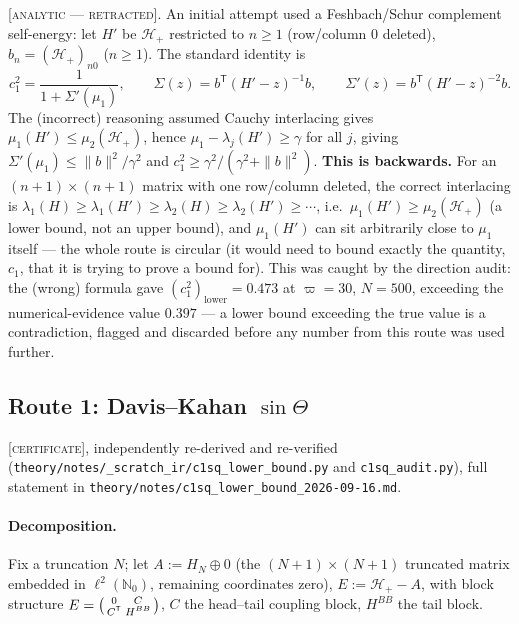 \documentclass[11pt]{article}
\newcommand{\HH}{\mathcal{H}}
\begin{document}
\textsc{[analytic --- retracted]}. An initial attempt used a Feshbach/Schur
complement self-energy: let $H'$ be $\HH_+$ restricted to $n\ge1$ (row/column
0 deleted), $b_n=(\HH_+)_{n0}$ ($n\ge1$). The standard identity is
\[
 c_1^2=\frac1{1+\Sigma'(\mu_1)},\qquad \Sigma(z)=b^{\mathsf T}(H'-z)^{-1}b,\qquad
 \Sigma'(z)=b^{\mathsf T}(H'-z)^{-2}b.
\]
The (incorrect) reasoning assumed Cauchy interlacing gives
$\mu_1(H')\le\mu_2(\HH_+)$, hence $\mu_1-\lambda_j(H')\ge\gamma$ for all $j$,
giving $\Sigma'(\mu_1)\le\|b\|^2/\gamma^2$ and
$c_1^2\ge\gamma^2/(\gamma^2+\|b\|^2)$. \textbf{This is backwards.} For an
$(n+1)\times(n+1)$ matrix with one row/column deleted, the correct interlacing
is $\lambda_1(H)\ge\lambda_1(H')\ge\lambda_2(H)\ge\lambda_2(H')\ge\cdots$,
i.e.\ $\mu_1(H')\ge\mu_2(\HH_+)$ (a lower bound, not an upper bound), and
$\mu_1(H')$ can sit arbitrarily close to $\mu_1$ itself --- the whole route
is circular (it would need to bound exactly the quantity, $c_1$, that it is
trying to prove a bound for). This was caught by the direction audit: the
(wrong) formula gave $(c_1^2)_{\text{lower}}=0.473$ at $\varpi=30$, $N=500$,
exceeding the numerical-evidence value $0.397$ --- a lower bound exceeding
the true value is a contradiction, flagged and discarded before any number
from this route was used further.

\subsection{Route 1: Davis--Kahan $\sin\Theta$}\label{sec:dk}

\textsc{[certificate]}, independently re-derived and re-verified
(\texttt{theory/notes/\_scratch\_ir/c1sq\_lower\_bound.py} and
\texttt{c1sq\_audit.py}), full statement in
\texttt{theory/notes/c1sq\_lower\_bound\_2026-09-16.md}.

\paragraph{Decomposition.} Fix a truncation $N$; let $A:=H_N\oplus0$ (the
$(N{+}1)\times(N{+}1)$ truncated matrix embedded in $\ell^2(\mathbb N_0)$,
remaining coordinates zero), $E:=\HH_+-A$, with block structure
$E=\begin{psmallmatrix}0&C\\ C^{\mathsf T}&H^{BB}\end{psmallmatrix}$, $C$ the
head--tail coupling block, $H^{BB}$ the tail block.
\end{document}

